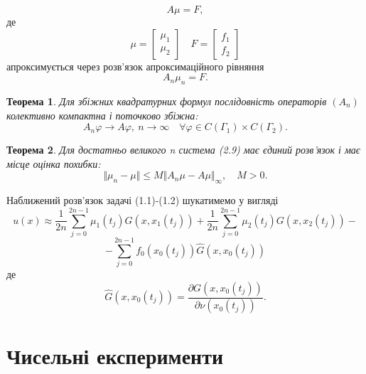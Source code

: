 \documentclass[a4 paper,12pt,ukrainian]{report}
\newtheorem{theorem}{\textbf{Теорема}}[chapter]
\begin{document}
\begin{equation*}
A\mu=F,
\end{equation*}
де 
\begin{equation*}
\mu=\left[
\begin{array}{c}
\mu_{1}\\
\mu_{2}
\end{array}
\right]\quad
F=\left[
\begin{array}{c}
f_{1}\\
f_{2}
\end{array}
\right]
\end{equation*}
апроксимується через розв'язок апроксимаційного рівняння
\begin{equation*}
A_{n}\mu_{n}=F.
\end{equation*}
\begin{theorem}
Для збіжних квадратурних формул послідовність операторів $(A_{n})$ колективно компактна і поточково збіжна:
\begin{equation*}
A_{n}\varphi\rightarrow A\varphi, \ n\to\infty \quad \forall\varphi\in C(\Gamma_{1})\times C(\Gamma_{2}).
\end{equation*}
\end{theorem}
\begin{theorem}
Для достатньо великого n система (2.9) має єдиний розв'язок і має місце оцінка похибки:
\begin{equation*}
\Vert\mu_{n}-\mu\Vert\le M\Vert A_{n}\mu-A\mu\Vert_{\infty}, \quad M>0.
\end{equation*}
\end{theorem}
\hspace*{\parindent}Наближений розв'язок задачі (1.1)-(1.2) шукатимемо у вигляді
\begin{equation*}
u(x)\approx\frac{1}{2n}\sum\limits_{j=0}^{2n-1}{\mu_1(t_j)G(x,x_1(t_j))}+\frac{1}{2n}\sum\limits_{j=0}^{2n-1}{\mu_2(t_j)G(x,x_2(t_j))}-
\end{equation*}
\begin{equation*}
-\sum\limits_{j=0}^{2n-1}{f_0(x_0(t_j))\widehat{G}(x,x_0(t_j))}
\end{equation*}
де 
\begin{equation*}
\widehat{G}(x,x_0(t_j))=\frac{\partial G(x,x_0(t_j))}{\partial\nu(x_0(t_j))}.
\end{equation*}
\chapter{Чисельні експерименти}
\end{document}
